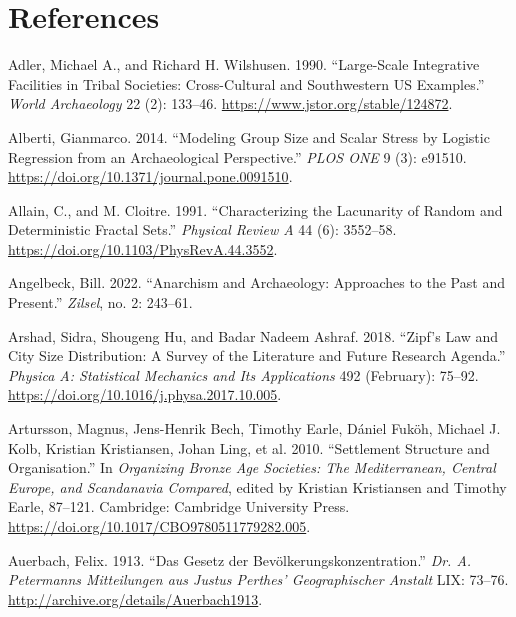 \documentclass[
  12pt,
  a4paper, twoside]{book}
\newlength{\cslhangindent}
\newlength{\cslentryspacingunit} %
\newenvironment{CSLReferences}[2] %
 {%
  \setlength{\parindent}{0pt}
  \ifodd #1
  \let\oldpar\par
  \def\par{\hangindent=\cslhangindent\oldpar}
  \fi
  \setlength{\parskip}{#2\cslentryspacingunit}
 }%
 {}
\begin{document}
\hypertarget{refs}{}
\begin{CSLReferences}{1}{0}
\hypertarget{references}{%
\chapter*{References}\label{references}}

\leavevmode{}%
Adler, Michael A., and Richard H. Wilshusen. 1990. {``Large-Scale Integrative Facilities in Tribal Societies: Cross-Cultural and Southwestern US Examples.''} \emph{World Archaeology} 22 (2): 133--46. \url{https://www.jstor.org/stable/124872}.

\leavevmode{}%
Alberti, Gianmarco. 2014. {``Modeling Group Size and Scalar Stress by Logistic Regression from an Archaeological Perspective.''} \emph{PLOS ONE} 9 (3): e91510. \url{https://doi.org/10.1371/journal.pone.0091510}.

\leavevmode{}%
Allain, C., and M. Cloitre. 1991. {``Characterizing the Lacunarity of Random and Deterministic Fractal Sets.''} \emph{Physical Review A} 44 (6): 3552--58. \url{https://doi.org/10.1103/PhysRevA.44.3552}.

\leavevmode{}%
Angelbeck, Bill. 2022. {``Anarchism and Archaeology: Approaches to the Past and Present.''} \emph{Zilsel}, no. 2: 243--61.

\leavevmode{}%
Arshad, Sidra, Shougeng Hu, and Badar Nadeem Ashraf. 2018. {``Zipf{'}s Law and City Size Distribution: A Survey of the Literature and Future Research Agenda.''} \emph{Physica A: Statistical Mechanics and Its Applications} 492 (February): 75--92. \url{https://doi.org/10.1016/j.physa.2017.10.005}.

\leavevmode{}%
Artursson, Magnus, Jens-Henrik Bech, Timothy Earle, Dániel Fuköh, Michael J. Kolb, Kristian Kristiansen, Johan Ling, et al. 2010. {``Settlement {Structure} and {Organisation}.''} In \emph{Organizing {Bronze Age Societies}: {The Mediterranean}, {Central Europe}, and {Scandanavia Compared}}, edited by Kristian Kristiansen and Timothy Earle, 87--121. {Cambridge}: {Cambridge University Press}. \url{https://doi.org/10.1017/CBO9780511779282.005}.

\leavevmode{}%
Auerbach, Felix. 1913. {``Das Gesetz der Bevölkerungskonzentration.''} \emph{Dr. A. Petermanns Mitteilungen aus Justus Perthes' Geographischer Anstalt} LIX: 73--76. \url{http://archive.org/details/Auerbach1913}.


\end{CSLReferences}
\end{document}
